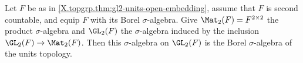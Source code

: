 Let $F$ be as in \cref{X.topgrp.thm:gl2-units-open-embedding}, assume that $F$ is second countable, and equip $F$
with its Borel $\sigma$-algebra. Give $\Mat_2(F)=F^{2\times2}$ the product $\sigma$-algebra and $\GL_2(F)$ the
$\sigma$-algebra induced by the inclusion $\GL_2(F)\to\Mat_2(F)$. Then this $\sigma$-algebra on $\GL_2(F)$ is the Borel
$\sigma$-algebra of the units topology.
